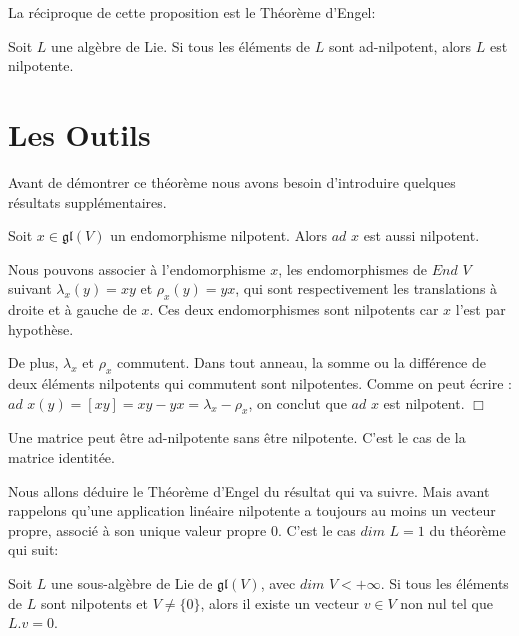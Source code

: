 \documentclass[a4paper,openany,12pt]{report}
\newcommand{\gl}{\mathfrak{gl}}
\theoremstyle{break}
{\theorembodyfont{\upshape}
\newtheorem*{rmq}{Remarque :}
\newtheorem*{prv}{Preuve :}
\newtheorem*{ex}{Exemples :}
\newtheorem*{exe}{Exemple : }
\newtheorem*{nota}{Notation :}
\newtheorem*{dem}{D\'emonstration :}}
\begin{document}
La réciproque de cette proposition est le Théorème d'Engel:

\begin{thm}\label{thm:engel}
\quad Soit $L$ une algèbre de Lie.
Si tous les éléments de $L$ sont ad-nilpotent, alors $L$ est nilpotente.
\end{thm}

\section{Les Outils}

\quad Avant de démontrer ce théorème nous avons besoin d’introduire quelques résultats supplémentaires.

\begin{lem}\label{lem:E1}
\quad Soit $x \in \gl(V)$ un endomorphisme nilpotent. Alors $ad$ $x$ est aussi nilpotent. 
\end{lem}

\begin{prv}
\quad Nous pouvons associer à l'endomorphisme $x$, les endomorphismes de $End$ $V$ suivant $\lambda_{x}(y)=xy$ et $\rho_{x}(y)=yx$, qui sont respectivement les translations à droite et à gauche de $x$. Ces deux endomorphismes sont nilpotents car $x$ l'est par hypothèse.

De plus, $\lambda_{x}$ et $\rho_{x}$ commutent. Dans tout anneau, la somme ou la différence de deux éléments nilpotents qui commutent sont nilpotentes. Comme on peut écrire :
$ad$ $x(y)= [xy] = xy-yx = \lambda_{x} - \rho_{x}$, on conclut que $ad$ $x$ est nilpotent. $\Box$
\end{prv}

\begin{rmq}
\quad Une matrice peut être ad-nilpotente sans être nilpotente. C'est le cas de la matrice identitée. 
\end{rmq}

Nous allons déduire le Théorème d'Engel du résultat qui va suivre. Mais avant rappelons qu'une application linéaire nilpotente a toujours au moins un vecteur propre, associé à son unique valeur propre $0$. C'est le cas $dim$  $L = 1$ du théorème qui suit:

\begin{thm}\label{thm:E1}
\quad Soit $L$ une sous-algèbre de Lie de $\gl (V)$, avec $dim$ $V < + \infty$. Si tous les éléments de $L$ sont nilpotents et $V  \neq  \{0\}$, alors il existe un vecteur $v \in V$ non nul tel que $L.v = 0$.
\end{thm}
\end{document}
